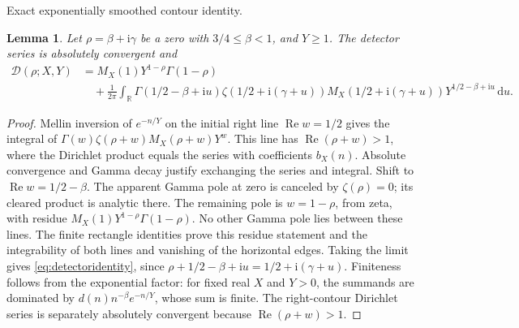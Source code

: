 \documentclass[11pt,a4paper]{article}
\numberwithin{equation}{section}
\newtheorem{lemma}[theorem]{Lemma}
\theoremstyle{definition}
\newcommand{\R}{\mathbb R}
\newcommand{\dd}{\,\mathrm d}
\newcommand{\ii}{\mathrm i}
\newcommand{\Rea}{\operatorname{Re}}
\begin{document}
\par\medskip\noindent Exact exponentially smoothed contour identity.
\begin{lemma}\label{lem:detectoridentity}
Let $\rho=\beta+\ii\gamma$ be a zero with $3/4\le\beta<1$, and $Y\ge1$.
The detector series is absolutely convergent and
\begin{align}\label{eq:detectoridentity}
 \mathcal D(\rho;X,Y)
 &=M_X(1)Y^{1-\rho}\Gamma(1-\rho)\\
 &\quad+\frac1{2\pi}\int_{\R}\Gamma(1/2-\beta+\ii u)
 \zeta(1/2+\ii(\gamma+u))M_X(1/2+\ii(\gamma+u))
 Y^{1/2-\beta+\ii u}\dd u.\nonumber
\end{align}
\end{lemma}
\begin{proof}
Mellin inversion of $e^{-n/Y}$ on the initial right line
$\Rea w=1/2$ gives the integral of
$\Gamma(w)\zeta(\rho+w)M_X(\rho+w)Y^w$.
This line has $\Rea(\rho+w)>1$, where the Dirichlet product equals the
series with coefficients $b_X(n)$. Absolute convergence and Gamma decay
justify exchanging the series and integral. Shift to
$\Rea w=1/2-\beta$. The apparent Gamma pole at zero is canceled by
$\zeta(\rho)=0$; its cleared product is analytic there. The remaining pole
is $w=1-\rho$, from zeta, with residue
$M_X(1)Y^{1-\rho}\Gamma(1-\rho)$. No other Gamma pole lies between these
lines. The finite rectangle identities prove this residue statement and the
integrability of both lines and vanishing of the horizontal edges. Taking the
limit gives \eqref{eq:detectoridentity}, since
$\rho+1/2-\beta+\ii u=1/2+\ii(\gamma+u)$.
Finiteness follows from the exponential factor: for fixed real $X$ and $Y>0$, the
summands are dominated by $d(n)n^{-\beta}e^{-n/Y}$, whose sum is finite.
The right-contour Dirichlet series is separately absolutely convergent
because $\Rea(\rho+w)>1$.
\end{proof}
\end{document}

